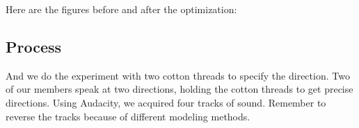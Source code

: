 \documentclass[UTF8]{article}
\begin{document}
Here are the figures before and after the optimization:
\begin{figure}[H]
    \centering
    \hspace{0.4in}
\end{figure}

\subsection{Process}
\hspace{0.5em} And we do the experiment with two cotton threads to specify the direction. Two of our members speak at two directions, holding the cotton threads to get precise directions. Using Audacity, we acquired four tracks of sound. Remember to reverse the tracks because of different modeling methods.
\end{document}
